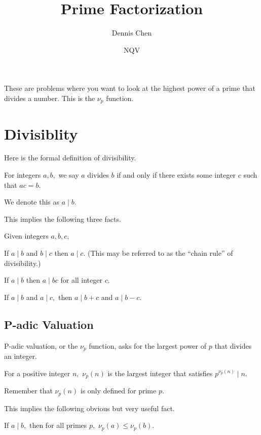 \documentclass[mast]{lucky}
\title{Prime Factorization}
\author{Dennis Chen}
\date{NQV}
\begin{document}
\maketitle

These are problems where you want to look at the highest power of a prime that divides a number. This is the $\nu_p$ function.

\section{Divisiblity}

Here is the formal definition of divisibility.

\begin{defi}[Divisibility]
For integers $a,b,$ we say $a$ divides $b$ if and only if there exists some integer $c$ such that $ac=b.$

We denote this as $a\mid b.$ %
\end{defi}
This implies the following three facts.

\begin{fact}
Given integers $a,b,c,$
\begin{itemize}
    \Item If $a\mid b$ and $b\mid c$ then $a\mid c.$ (This may be referred to as the “chain rule” of divisibility.)
    
    \Item If $a\mid b$ then $a\mid bc$ for all integer $c.$
    
    \Item If $a\mid b$ and $a\mid c,$ then $a\mid b+c$ and $a\mid b-c.$
\end{itemize}
\end{fact}

\subsection{P-adic Valuation}

P-adic valuation, or the $\nu_p$ function, asks for the largest power of $p$ that divides an integer.

\begin{defi}
For a positive integer $n,$ $\nu_p(n)$ is the largest integer that satisfies $p^{\nu_p(n)}\mid n.$
\end{defi}

Remember that $\nu_p(n)$ is only defined for prime $p.$

This implies the following obvious but very useful fact.

\begin{fact}
If $a\mid b,$ then for all primes $p,$ $\nu_p(a)\leq \nu_p(b).$
\end{fact}
\end{document}
